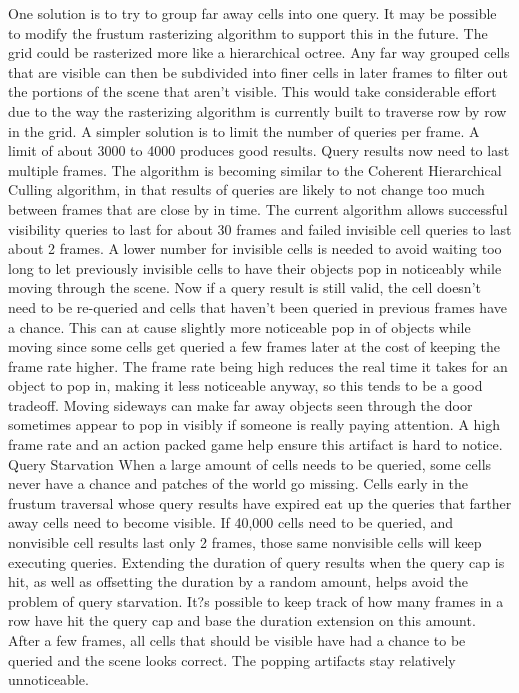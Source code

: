 \documentclass[12pt]{ucthesis}
\begin{document}
One solution is to try to group far away cells into one query.  It may be possible to modify the frustum rasterizing algorithm to support this in the future.  The grid could be rasterized more like a hierarchical octree.  Any far way grouped cells that are visible can then be subdivided into finer cells in later frames to filter out the portions of the scene that aren't visible.  This would take considerable effort due to the way the rasterizing algorithm is currently built to traverse row by row in the grid.
A simpler solution is to limit the number of queries per frame.  A limit of about 3000 to 4000 produces good results.  Query results now need to last multiple frames.  The algorithm is becoming similar to the Coherent Hierarchical Culling algorithm, in that results of queries are likely to not change too much between frames that are close by in time.  The current algorithm allows successful visibility queries to last for about 30 frames and failed invisible cell queries to last about 2 frames.  A lower number for invisible cells is needed to avoid waiting too long to let previously invisible cells to have their objects pop in noticeably while moving through the scene.  Now if a query result is still valid, the cell doesn't need to be re-queried and cells that haven't been queried in previous frames have a chance.  This can at cause slightly more noticeable pop in of objects while moving since some cells get queried a few frames later at the cost of keeping the frame rate higher.  The frame rate being high reduces the real time it takes for an object to pop in, making it less noticeable anyway, so this tends to be a good tradeoff.
Moving sideways can make far away objects seen through the door sometimes appear to pop in visibly if someone is really paying attention.  A high frame rate and an action packed game help ensure this artifact is hard to notice.
Query Starvation
When a large amount of cells needs to be queried, some cells never have a chance and patches of the world go missing.  Cells early in the frustum traversal whose query results have expired eat up the queries that farther away cells need to become visible.  If 40,000 cells need to be queried, and nonvisible cell results last only 2 frames, those same nonvisible cells will keep executing queries. 
Extending the duration of query results when the query cap is hit, as well as offsetting the duration by a random amount, helps avoid the problem of query starvation.  It?s possible to keep track of how many frames in a row have hit the query cap and base the duration extension on this amount.  After a few frames, all cells that should be visible have had a chance to be queried and the scene looks correct.  The popping artifacts stay relatively unnoticeable.
\end{document}
